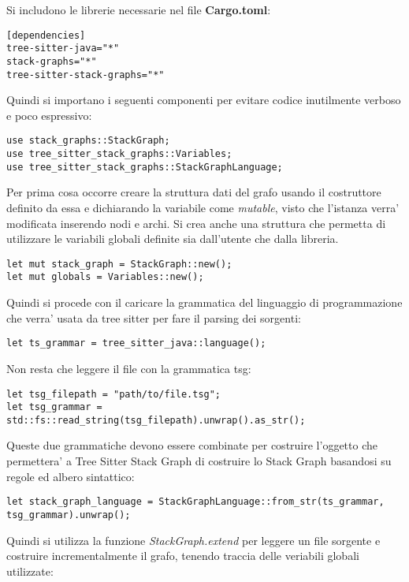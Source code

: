 Si includono le librerie necessarie nel file \textbf{Cargo.toml}:

\begin{lstlisting}
[dependencies]
tree-sitter-java="*"
stack-graphs="*"
tree-sitter-stack-graphs="*"
\end{lstlisting}

Quindi si importano i seguenti componenti per evitare codice inutilmente verboso e poco espressivo:
\begin{lstlisting}
use stack_graphs::StackGraph;
use tree_sitter_stack_graphs::Variables; 
use tree_sitter_stack_graphs::StackGraphLanguage; 
\end{lstlisting}

Per prima cosa occorre creare la struttura dati del grafo usando il costruttore definito da essa e dichiarando la variabile come \emph{mutable}, visto che l'istanza verra' modificata inserendo nodi e archi.
Si crea anche una struttura che permetta di utilizzare le variabili globali definite sia dall'utente che dalla libreria.

\begin{lstlisting}
let mut stack_graph = StackGraph::new();
let mut globals = Variables::new();
\end{lstlisting}

Quindi si procede con il caricare la grammatica del linguaggio di programmazione che verra' usata da tree sitter per fare il parsing dei sorgenti:

\begin{lstlisting}
let ts_grammar = tree_sitter_java::language();
\end{lstlisting}

Non resta che leggere il file con la grammatica tsg:

\begin{lstlisting}
let tsg_filepath = "path/to/file.tsg";
let tsg_grammar = std::fs::read_string(tsg_filepath).unwrap().as_str();
\end{lstlisting}

Queste due grammatiche devono essere combinate per costruire l'oggetto che permettera' a Tree Sitter Stack Graph di costruire lo Stack Graph basandosi su regole ed albero sintattico:

\begin{lstlisting}
let stack_graph_language = StackGraphLanguage::from_str(ts_grammar, tsg_grammar).unwrap();
\end{lstlisting}

Quindi si utilizza la funzione \emph{StackGraph.extend} per leggere un file sorgente e costruire incrementalmente il grafo, tenendo traccia delle veriabili globali utilizzate:

